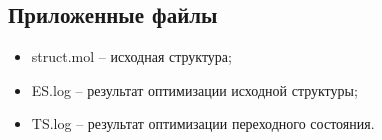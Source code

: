 \subsection{Приложенные файлы}
\begin{itemize}
    \item struct.mol – исходная структура;
    \item ES.log – результат оптимизации исходной структуры;
    \item TS.log – результат оптимизации переходного состояния.
\end{itemize}{}